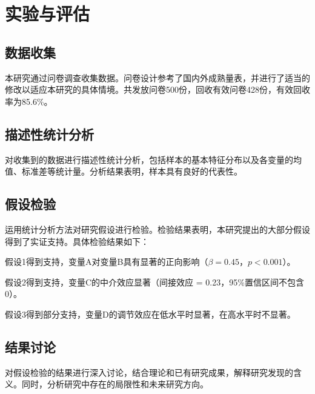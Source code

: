 
\chapter{实验与评估}

\section{数据收集}

本研究通过问卷调查收集数据。问卷设计参考了国内外成熟量表，并进行了适当的修改以适应本研究的具体情境。共发放问卷500份，回收有效问卷428份，有效回收率为85.6\%。

\section{描述性统计分析}

对收集到的数据进行描述性统计分析，包括样本的基本特征分布以及各变量的均值、标准差等统计量。分析结果表明，样本具有良好的代表性。

\section{假设检验}

运用统计分析方法对研究假设进行检验。检验结果表明，本研究提出的大部分假设得到了实证支持。具体检验结果如下：

假设1得到支持，变量A对变量B具有显著的正向影响（$\beta = 0.45$，$p < 0.001$）。

假设2得到支持，变量C的中介效应显著（间接效应 = 0.23，95\%置信区间不包含0）。

假设3得到部分支持，变量D的调节效应在低水平时显著，在高水平时不显著。

\section{结果讨论}

对假设检验的结果进行深入讨论，结合理论和已有研究成果，解释研究发现的含义。同时，分析研究中存在的局限性和未来研究方向。
